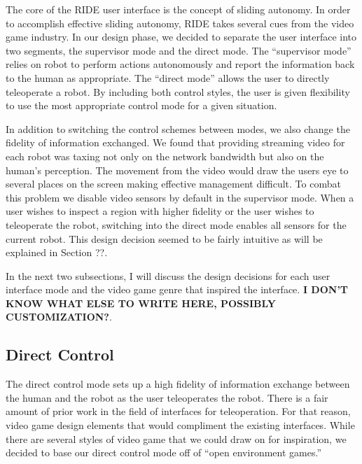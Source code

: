 The core of the RIDE user interface is the concept of sliding autonomy. In order to accomplish effective sliding autonomy, RIDE takes several cues from the video game industry. In our design phase, we decided to separate the user interface into two segments, the supervisor mode and the direct mode. The ``supervisor mode'' relies on robot to perform actions autonomously and report the information back to the human as appropriate. The ``direct mode'' allows the user to directly teleoperate a robot. By including both control styles, the user is given flexibility to use the most appropriate control mode for a given situation.

In addition to switching the control schemes between modes, we also change the fidelity of information exchanged. We found that providing streaming video for each robot was taxing not only on the network bandwidth but also on the human's perception. The movement from the video would draw the users eye to several places on the screen making effective management difficult. To combat this problem we disable video sensors by default in the supervisor mode. When a user wishes to inspect a region with higher fidelity or the user wishes to teleoperate the robot, switching into the direct mode enables all sensors for the current robot. This design decision seemed to be fairly intuitive as will be explained in Section ??.

In the next two subsections, I will discuss the design decisions for each user interface mode and the video game genre that inspired the interface. \textbf{I DON'T KNOW WHAT ELSE TO WRITE HERE, POSSIBLY CUSTOMIZATION?}.

% 
\subsection{Direct Control}

The direct control mode sets up a high fidelity of information exchange between the human and the robot as the user teleoperates the robot. There is a fair amount of prior work in the field of interfaces for teleoperation. For that reason, video game design elements that would compliment the existing interfaces. While there are several styles of video game that we could draw on for inspiration, we decided to base our direct control mode off of ``open environment games.''

